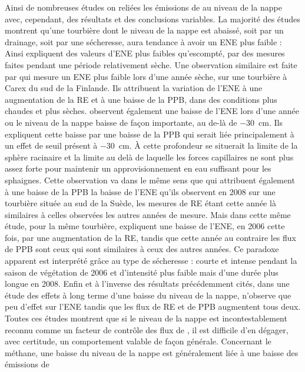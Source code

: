Ainsi de nombreuses études on reliées les émissions de \coo au niveau de la nappe avec, cependant, des résultats et des conclusions variables.
La majorité des études montrent qu'une tourbière dont le niveau de la nappe est abaissé, soit par un drainage, soit par une sécheresse, aura tendance à avoir un ENE plus faible :
Ainsi \citet{strack2013} expliquent des valeurs d'ENE plus faibles qu'escompté, par des mesures faites pendant une période relativement sèche.
Une observation similaire est faite par \citet{aurela2007} qui mesure un ENE plus faible lors d'une année sèche, sur une tourbière à Carex du sud de la Finlande.
Ils attribuent la variation de l'ENE à une augmentation de la RE et à une baisse de la PPB, dans des conditions plus chaudes et plus sèches.
\citet{peichl2014} observent également une baisse de l'ENE lors d'une année ou le niveau de la nappe baisse de façon importante, au de-là de \SI{-30}{\centi\metre}.
Ils expliquent cette baisse par une baisse de la PPB qui serait liée principalement à un effet de seuil présent à \SI{-30}{\centi\metre}.
À cette profondeur se situerait la limite de la sphère racinaire et la limite au delà de laquelle les forces capillaires ne sont plus assez forte pour maintenir un approvisionnement en eau suffisant pour les sphaignes.
Cette observation va dans le même sens que \citet{lund2012} qui attribuent également à une baisse de la PPB la baisse de l'ENE qu'ils observent en 2008 sur une tourbière située au sud de la Suède, les mesures de RE étant cette année là similaires à celles observées les autres années de mesure.
Mais dans cette même étude, pour la même tourbière, \citet{lund2012} expliquent une baisse de l'ENE, en 2006 cette fois, par une augmentation de la RE, tandis que cette année au contraire les flux de PPB sont ceux qui sont similaires à ceux des autres années.
Ce paradoxe apparent est interprété grâce au type de sécheresse : courte et intense pendant la saison de végétation de 2006 et d'intensité plus faible mais d'une durée plus longue en 2008.
Enfin et à l'inverse des résultats précédemment cités, \citet{ballantyne2014} dans une étude des effets à long terme d'une baisse du niveau de la nappe, n'observe que peu d'effet sur l'ENE tandis que les flux de RE et de PPB augmentent tous deux.
Toutes ces études montrent que si le niveau de la nappe est incontestablement reconnu comme un facteur de contrôle des flux de \coo, il est difficile d'en dégager, avec certitude, un comportement valable de façon générale.
Concernant le méthane, une baisse du niveau de la nappe est généralement liée à une baisse des émissions de \chh

